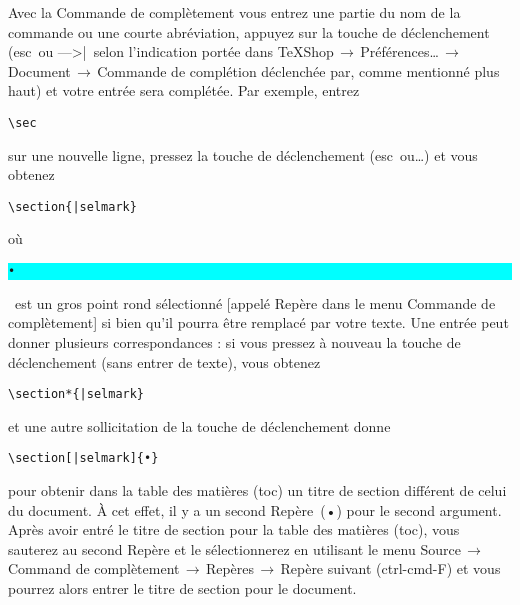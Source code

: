 \documentclass[11pt,french]{article}
\newcommand{\esckey}{\textsf{esc}}
\newcommand{\tabkey}{---\kern-5pt>|}
\newcommand{\mnu}[1]{\textsf{#1}}
\newcommand{\cmd}[1]{\textsf{#1}}
\newcommand{\To}{\,\(\to\)\,}
\newcommand{\selmark}{\colorbox{cyan}{\rule[-0.5ex]{0ex}{2.1ex}\texttt{•}}}
\begin{document}
Avec la \cmd{Commande de complètement} vous entrez une partie du nom de la commande ou une courte abréviation, appuyez sur la touche de déclenchement (\esckey\ ou \tabkey\, selon l'indication portée dans \mnu{TeXShop}\To\mnu{Préférences…}\To\mnu{Document}\To\mnu{Commande de complétion déclenchée par}, comme mentionné plus haut) et votre entrée sera complétée. Par exemple, entrez
\begin{verbatim}
\sec
\end{verbatim}
sur une nouvelle ligne, pressez la touche de déclenchement (\esckey\ ou…) et vous obtenez
\begin{verbatim}
\section{|selmark}
\end{verbatim}
où \selmark\ est un gros point rond sélectionné [appelé \cmd{Repère} dans le menu \cmd{Commande de complètement}] si bien qu'il pourra être  remplacé par votre texte. Une entrée peut donner plusieurs correspondances : si vous pressez à nouveau la touche de déclenchement (sans entrer de texte), vous obtenez
\begin{verbatim}
\section*{|selmark}
\end{verbatim}
et une autre sollicitation de la touche de déclenchement donne
\begin{verbatim}
\section[|selmark]{•}
\end{verbatim}
pour obtenir dans la table des matières (\cmd{toc}) un titre de section différent de celui du document. À cet effet, il y a un second \cmd{Repère}~(•) pour le second argument. Après avoir entré le titre de section pour la table des matières (\cmd{toc}), vous sauterez au second \cmd{Repère} et le sélectionnerez en utilisant le menu \mnu{Source}\To\mnu{Command de complètement}\To\mnu{Repères}\To\mnu{Repère suivant} (\cmd{ctrl-cmd-F}) et vous pourrez alors entrer le titre de section pour le document.\medskip
\end{document}
